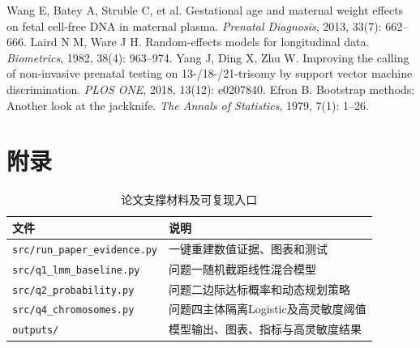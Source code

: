\documentclass[withoutpreface,bwprint]{format}
\begin{document}
\begin{thebibliography}{99}
 Wang E, Batey A, Struble C, et al. Gestational age and maternal weight effects on fetal cell-free DNA in maternal plasma. \textit{Prenatal Diagnosis}, 2013, 33(7): 662--666.
 Laird N M, Ware J H. Random-effects models for longitudinal data. \textit{Biometrics}, 1982, 38(4): 963--974.
 Yang J, Ding X, Zhu W. Improving the calling of non-invasive prenatal testing on 13-/18-/21-trisomy by support vector machine discrimination. \textit{PLOS ONE}, 2018, 13(12): e0207840.
 Efron B. Bootstrap methods: Another look at the jackknife. \textit{The Annals of Statistics}, 1979, 7(1): 1--26.
\end{thebibliography}

\makeatletter\let\@oldaddcontentsline\addcontentsline\renewcommand{\addcontentsline}[3]{}\section*{附录}\let\addcontentsline\@oldaddcontentsline\makeatother
\begin{table}[H]\centering\small
\caption{论文支撑材料及可复现入口}\label{tab:appendix}
\begin{tabularx}{\textwidth}{LX}\toprule 文件&说明\\\midrule
\texttt{src/run\_paper\_evidence.py}&一键重建数值证据、图表和测试\\
\texttt{src/q1\_lmm\_baseline.py}&问题一随机截距线性混合模型\\
\texttt{src/q2\_probability.py}&问题二边际达标概率和动态规划策略\\
\texttt{src/q4\_chromosomes.py}&问题四主体隔离Logistic及高灵敏度阈值\\
\texttt{outputs/}&模型输出、图表、指标与高灵敏度结果\\
\bottomrule\end{tabularx}\end{table}
\end{document}
